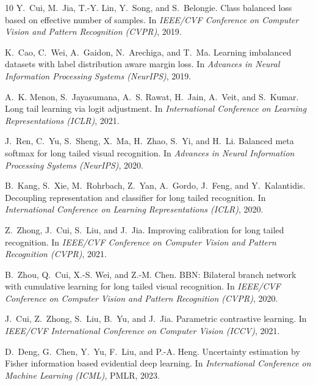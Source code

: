 \documentclass[letterpaper]{article}
\begin{document}
\begin{thebibliography}{10}
Y.~Cui, M.~Jia, T.-Y. Lin, Y.~Song, and S.~Belongie.
\newblock Class balanced loss based on effective number of samples.
\newblock In {\em IEEE/CVF Conference on Computer Vision and Pattern Recognition (CVPR)}, 2019.

K.~Cao, C.~Wei, A.~Gaidon, N.~Arechiga, and T.~Ma.
\newblock Learning imbalanced datasets with label distribution aware margin loss.
\newblock In {\em Advances in Neural Information Processing Systems (NeurIPS)}, 2019.

A.~K. Menon, S.~Jayasumana, A.~S. Rawat, H.~Jain, A.~Veit, and S.~Kumar.
\newblock Long tail learning via logit adjustment.
\newblock In {\em International Conference on Learning Representations (ICLR)}, 2021.

J.~Ren, C.~Yu, S.~Sheng, X.~Ma, H.~Zhao, S.~Yi, and H.~Li.
\newblock Balanced meta softmax for long tailed visual recognition.
\newblock In {\em Advances in Neural Information Processing Systems (NeurIPS)}, 2020.

B.~Kang, S.~Xie, M.~Rohrbach, Z.~Yan, A.~Gordo, J.~Feng, and Y.~Kalantidis.
\newblock Decoupling representation and classifier for long tailed recognition.
\newblock In {\em International Conference on Learning Representations (ICLR)}, 2020.

Z.~Zhong, J.~Cui, S.~Liu, and J.~Jia.
\newblock Improving calibration for long tailed recognition.
\newblock In {\em IEEE/CVF Conference on Computer Vision and Pattern Recognition (CVPR)}, 2021.

B.~Zhou, Q.~Cui, X.-S. Wei, and Z.-M. Chen.
\newblock BBN: Bilateral branch network with cumulative learning for long tailed visual recognition.
\newblock In {\em IEEE/CVF Conference on Computer Vision and Pattern Recognition (CVPR)}, 2020.

J.~Cui, Z.~Zhong, S.~Liu, B.~Yu, and J.~Jia.
\newblock Parametric contrastive learning.
\newblock In {\em IEEE/CVF International Conference on Computer Vision (ICCV)}, 2021.

D.~Deng, G.~Chen, Y.~Yu, F.~Liu, and P.-A. Heng.
\newblock Uncertainty estimation by Fisher information based evidential deep learning.
\newblock In {\em International Conference on Machine Learning (ICML)}, PMLR, 2023.


\end{thebibliography}
\end{document}
